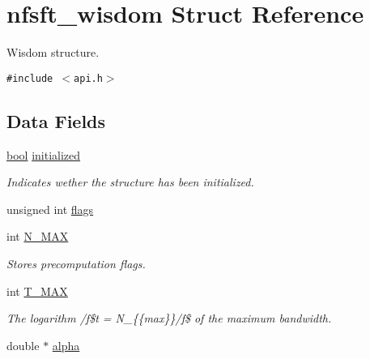 \hypertarget{structnfsft__wisdom}{
\section{nfsft\_\-wisdom Struct Reference}
\label{structnfsft__wisdom}
}
Wisdom structure.  


{\tt \#include $<$api.h$>$}

\subsection*{Data Fields}
\begin{CompactItemize}
\item 
\hyperlink{group__nfsft_gf6a258d8f3ee5206d682d799316314b1}{bool} \hyperlink{structnfsft__wisdom_bb3162b2e1faa123a9ef70f1374aa740}{initialized}
\begin{CompactList}\small\item\em Indicates wether the structure has been initialized. \item\end{CompactList}\item 
\hypertarget{structnfsft__wisdom_267b5c83fbfef2212669a2f61960e3d4}{
unsigned int \hyperlink{structnfsft__wisdom_267b5c83fbfef2212669a2f61960e3d4}{flags}}
\label{structnfsft__wisdom_267b5c83fbfef2212669a2f61960e3d4}

\item 
int \hyperlink{structnfsft__wisdom_c0d21110fe9475646b8174b1048cda51}{N\_\-MAX}
\begin{CompactList}\small\item\em Stores precomputation flags. \item\end{CompactList}\item 
\hypertarget{structnfsft__wisdom_e6c31fe1bc09d2894948358c2bea27e4}{
int \hyperlink{structnfsft__wisdom_e6c31fe1bc09d2894948358c2bea27e4}{T\_\-MAX}}
\label{structnfsft__wisdom_e6c31fe1bc09d2894948358c2bea27e4}

\begin{CompactList}\small\item\em The logarithm /f\$t =  N\_\-\{\{max\}\}/f\$ of the maximum bandwidth. \item\end{CompactList}\item 
\hypertarget{structnfsft__wisdom_755da8bd28cc1322415bd0ddcfceaf4e}{
double $\ast$ \hyperlink{structnfsft__wisdom_755da8bd28cc1322415bd0ddcfceaf4e}{alpha}}
\label{structnfsft__wisdom_755da8bd28cc1322415bd0ddcfceaf4e}


\end{CompactItemize}
